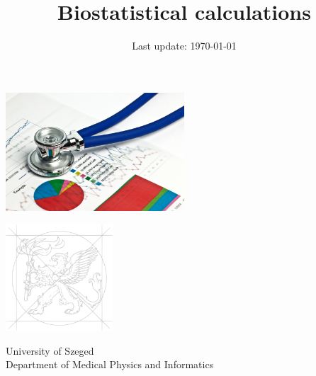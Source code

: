 \documentclass[a4paper,twoside]{memoir}
\title{\textbf{\HUGE Biostatistical calculations}}
\date{Last update: \today}
\makeatletter
\renewcommand\tableofcontents{%
    \@starttoc{toc}%
}
\makeatother
\begin{document}
	\begin{titlingpage}
		\thispagestyle{empty}
		\maketitle
			\begin{center}
				\includegraphics[width=0.5\textwidth]{Biostatistics}

				\thispagestyle{empty}	
		
				\vfill
				\includegraphics[width=0.3\textwidth]{Griff}
			
				University of Szeged\\
				Department of Medical Physics and Informatics
			\end{center}
		\clearpage
	
		\tableofcontents
	\end{titlingpage}\clearpage

	
	
	
	
	
	
	
	
	
	
 
\end{document}
